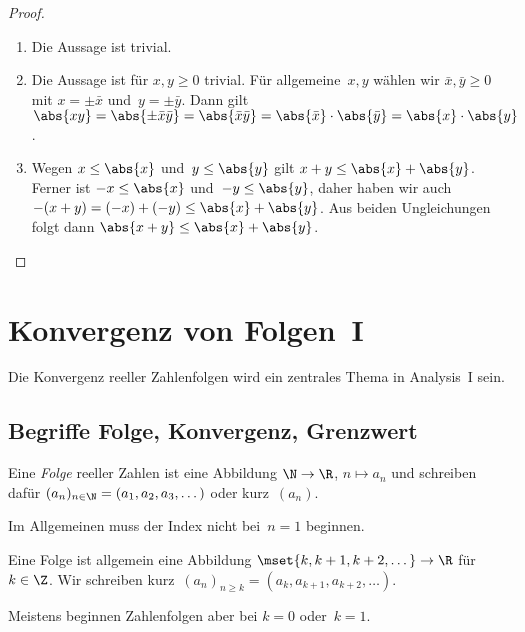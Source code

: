 \documentclass[a4paper]{article}
\begin{document}
\begin{proof}\leavevmode
    \begin{enumerate}
        \item Die Aussage ist trivial.
        \item Die Aussage ist für $x, y \geq 0$ trivial. Für allgemeine~$x, y$ wählen wir $\bar{x}, \bar{y} \geq 0$ mit $x = \pm\bar{x}$ und~$y = \pm\bar{y}$. Dann gilt $\abs{x y} = \abs{\pm \bar{x} \bar{y}} = \abs{\bar{x} \bar{y}} = \abs{\bar{x}} \cdot \abs{\bar{y}} = \abs{x} \cdot \abs{y}$.
        \item Wegen $x \leq \abs{x}$ und~$y \leq \abs{y}$ gilt $x + y \leq \abs{x} + \abs{y}$. Ferner ist $-x \leq \abs{x}$ und~$-y \leq \abs{y}$, daher haben wir auch $-(x + y) = (-x) + (-y) \leq \abs{x} + \abs{y}$. Aus beiden Ungleichungen folgt dann $\abs{x + y} \leq \abs{x} + \abs{y}$.\qedhere
    \end{enumerate}
\end{proof}

\section{Konvergenz von Folgen~I}

Die Konvergenz reeller Zahlenfolgen wird ein zentrales Thema in Analysis~I sein.

\subsection{Begriffe Folge, Konvergenz, Grenzwert}

\begin{definition}[Folge]
    Eine \emph{Folge} reeller Zahlen ist eine Abbildung $\N \to \R$, $n \mapsto a_n$ und schreiben dafür $(a_n)_{n \in \N} = (a_1, a_2, a_3, \dots)$ oder kurz~$(a_n)$.
\end{definition}

Im Allgemeinen muss der Index nicht bei~$n = 1$ beginnen.

\begin{definition}
    Eine Folge ist allgemein eine Abbildung $\mset{k, k+1, k+2, \dots} \to \R$ für~$k \in \Z$. Wir schreiben kurz~$(a_n)_{n \geq k} = (a_k, a_{k+1}, a_{k+2}, \dots)$.
\end{definition}

Meistens beginnen Zahlenfolgen aber bei $k = 0$ oder~$k = 1$.
\end{document}
